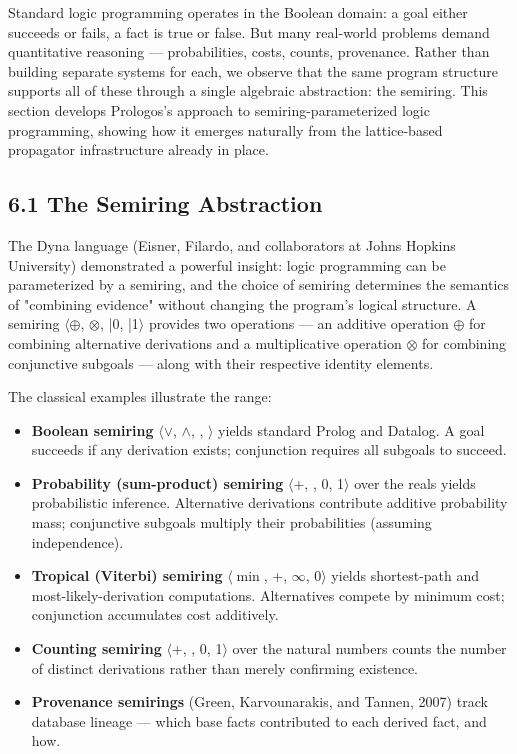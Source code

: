 \documentclass[11pt]{article}
\begin{document}
Standard logic programming operates in the Boolean domain: a goal either succeeds or fails, a fact is true or false. But many real-world problems demand quantitative reasoning --- probabilities, costs, counts, provenance. Rather than building separate systems for each, we observe that the same program structure supports all of these through a single algebraic abstraction: the semiring. This section develops Prologos's approach to semiring-parameterized logic programming, showing how it emerges naturally from the lattice-based propagator infrastructure already in place.
\subsection{6.1 The Semiring Abstraction}
\label{sec:org6421c60}

The Dyna language (Eisner, Filardo, and collaborators at Johns Hopkins University) demonstrated a powerful insight: logic programming can be parameterized by a semiring, and the choice of semiring determines the semantics of "combining evidence" without changing the program's logical structure. A semiring \(\langle \oplus\), \(\otimes\), \bar{0}, \bar{1}\(\rangle\) provides two operations --- an additive operation \(\oplus\) for combining alternative derivations and a multiplicative operation \(\otimes\) for combining conjunctive subgoals --- along with their respective identity elements.

The classical examples illustrate the range:

\begin{itemize}
\item \textbf{Boolean semiring} \(\langle \lor\), \(\land\), \bot, \top\(\rangle\) yields standard Prolog and Datalog. A goal succeeds if any derivation exists; conjunction requires all subgoals to succeed.
\item \textbf{Probability (sum-product) semiring} \(\langle\)+, \texttimes{}, 0, 1\(\rangle\) over the reals yields probabilistic inference. Alternative derivations contribute additive probability mass; conjunctive subgoals multiply their probabilities (assuming independence).
\item \textbf{Tropical (Viterbi) semiring} \(\langle \min\), +, \(\infty\), 0\(\rangle\) yields shortest-path and most-likely-derivation computations. Alternatives compete by minimum cost; conjunction accumulates cost additively.
\item \textbf{Counting semiring} \(\langle\)+, \texttimes{}, 0, 1\(\rangle\) over the natural numbers counts the number of distinct derivations rather than merely confirming existence.
\item \textbf{Provenance semirings} (Green, Karvounarakis, and Tannen, 2007) track database lineage --- which base facts contributed to each derived fact, and how.
\end{itemize}
\end{document}
